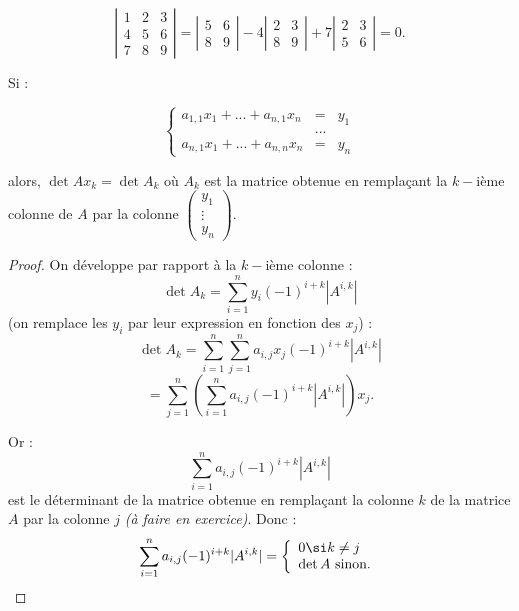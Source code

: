\documentclass[class=report,crop=false]{standalone}
\newcommand{\exoo}{\emph{(à faire en exercice)}}
\newcommand{\sinon}{\mbox{ sinon}}
\begin{document}
\begin{exemple}
\[\left|\begin{array}{ccc}
1 & 2 & 3 \\
4 & 5 & 6 \\
7 & 8 & 9
\end{array}\right| = \left|\begin{array}{cc}
5& 6\\
8 & 9
\end{array}\right| -4  \left|\begin{array}{cc}
2&3\\
8&9
\end{array}\right| + 7  \left|\begin{array}{cc}
2&3\\
5&6
\end{array}\right| = 0 .\]
\end{exemple}

\begin{proposition}
Si :

\[\left\{ \begin{array}{ccc}
a_{1,1}x_1 + ... + a_{n,1}x_n &=& y_1\\
&...&\\
a_{n,1}x_1 + ... + a_{n,n}x_n & =& y_n
\end{array}
\right.\]

alors, $\det A x_k = \det A_k$
où $A_k$ est la matrice obtenue en rempla\c{c}ant la $k-$ième colonne de $A$ par la colonne  $\left( \begin{array}{c}
y_1\\
\vdots\\
y_n
\end{array}\right)$. 
\end{proposition}

\begin{proof}
On développe par rapport à la $k-$ième colonne :
\[\det A_k = \sum_{i=1}^n y_i(-1)^{i+k}|A^{i,k}| \]
(on remplace les $y_i$ par leur expression en fonction des $x_j$) :
\[\det A_k = \sum_{i=1}^n\sum_{j=1}^na_{i,j}x_j(-1)^{i+k}|A^{i,k}|\]
\[= \sum_{j=1}^n \left( \sum_{i=1}^n a_{i,j}(-1)^{i+k}|A^{i,k}|\right) x_j .\]

Or : \[\sum_{i=1}^n a_{i,j}(-1)^{i+k}|A^{i,k}|\]
est le déterminant de la matrice obtenue en rempla\c{c}ant la colonne $k$ de la matrice $A$ par la colonne $j$ \exoo. Donc :
 \[\sum_{i=1}^n a_{i,j}(-1)^{i+k}|A^{i,k}| = \left\{\begin{array}{l}
0 \si k \neq j\\
\det A \sinon.
\end{array}\right.\]
\end{proof}
\end{document}
